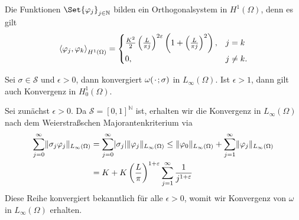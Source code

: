 \begin{Lemma}
    Die Funktionen $\Set{ \varphi_{j} }_{j \in \mathbb{N}}$ bilden ein Orthogonalsystem in $H^{1}(\Omega)$, denn es gilt
    \begin{equation}
        \left\langle\varphi_{j},\varphi_{k}\right\rangle_{H^{1}(\Omega)} = \begin{cases}
            \frac{K^2}{2} \left( \frac{L}{\pi j} \right)^{2\varepsilon} \left( 1 +   \left( \frac{L}{\pi j} \right)^{2} \right),   &j = k \\
            0,          &j \neq k.
        \end{cases}
    \end{equation}
\end{Lemma}

\begin{Lemma}
    Sei $\sigma \in \mathcal S$ und $\epsilon > 0$, dann konvergiert $\omega({\mkern2mu\cdot\mkern2mu}; \sigma)$ in $L_{\infty}(\Omega)$.
    Ist $\epsilon > 1$, dann gilt auch Konvergenz in $H^{1}_{0}(\Omega)$.

    \begin{Beweis}
        Sei zunächst $\epsilon > 0$.
        Da $\mathcal S = [0, 1]^{\mathbb{N}}$ ist, erhalten wir die Konvergenz in $L_{\infty}(\Omega)$ nach dem Weierstraßschen Majorantenkriterium via
        \begin{align}
            \sum_{j = 0}^{\infty} \lVert\sigma_{j} \varphi_{j}\rVert_{L_{\infty}(\Omega)}
            &= \sum_{j = 0}^{\infty} \lvert\sigma_{j}\rvert \lVert\varphi_{j}\rVert_{L_{\infty}(\Omega)}
             \leq \lVert\varphi_{0}\rVert_{L_{\infty}(\Omega)} + \sum_{j = 1}^{\infty}  \lVert\varphi_{j}\rVert_{L_{\infty}(\Omega)}
            \\&= K +  K \left( \frac{L}{\pi} \right)^{1 + \varepsilon} \sum_{j = 1}^{\infty} \frac{1}{j^{1+\varepsilon}}
        \end{align}
        Diese Reihe konvergiert bekanntlich für alle $\epsilon > 0$, womit wir Konvergenz von $\omega$ in $L_{\infty}(\Omega)$ erhalten.


\end{Beweis}
\end{Lemma}
